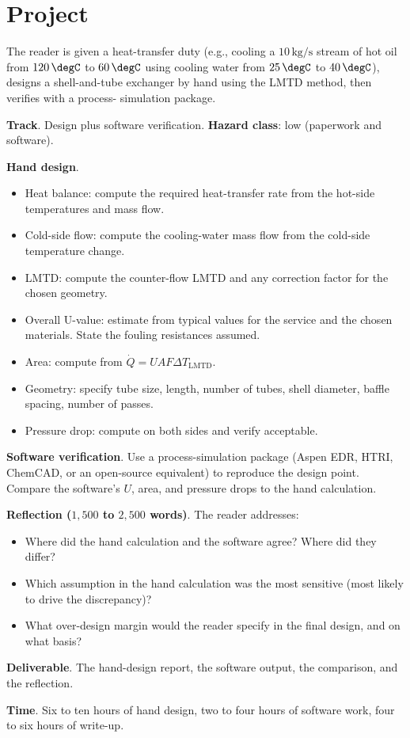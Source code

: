 \section{Project}

\begin{project}
The reader is given a heat-transfer duty (e.g., cooling a $10\,\text{kg/s}$
stream of hot oil from $120\,\degC$ to $60\,\degC$ using cooling water
from $25\,\degC$ to $40\,\degC$), designs a shell-and-tube exchanger
by hand using the LMTD method, then verifies with a process-
simulation package.

\textbf{Track}. Design plus software verification.
\textbf{Hazard class}: low (paperwork and software).

\textbf{Hand design}.

\begin{itemize}[leftmargin=*]
  \item Heat balance: compute the required heat-transfer rate from
    the hot-side temperatures and mass flow.
  \item Cold-side flow: compute the cooling-water mass flow from the
    cold-side temperature change.
  \item LMTD: compute the counter-flow LMTD and any correction factor
    for the chosen geometry.
  \item Overall U-value: estimate from typical values for the service
    and the chosen materials. State the fouling resistances assumed.
  \item Area: compute from $\dot{Q} = U A F \Delta T_{\text{LMTD}}$.
  \item Geometry: specify tube size, length, number of tubes, shell
    diameter, baffle spacing, number of passes.
  \item Pressure drop: compute on both sides and verify acceptable.
\end{itemize}

\textbf{Software verification}. Use a process-simulation package
(Aspen EDR, HTRI, ChemCAD, or an open-source equivalent) to
reproduce the design point. Compare the software's $U$, area, and
pressure drops to the hand calculation.

\textbf{Reflection ($1{,}500$ to $2{,}500$ words)}. The reader
addresses:

\begin{itemize}[leftmargin=*]
  \item Where did the hand calculation and the software agree?
    Where did they differ?
  \item Which assumption in the hand calculation was the most
    sensitive (most likely to drive the discrepancy)?
  \item What over-design margin would the reader specify in the
    final design, and on what basis?
\end{itemize}

\textbf{Deliverable}. The hand-design report, the software output,
the comparison, and the reflection.

\textbf{Time}. Six to ten hours of hand design, two to four hours of
software work, four to six hours of write-up.
\end{project}

